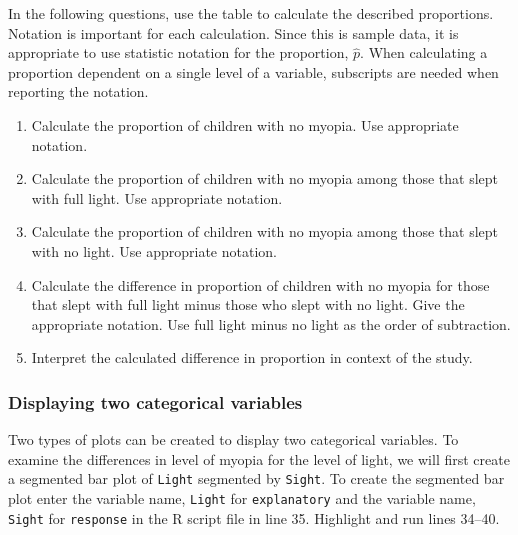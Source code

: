 \documentclass[
]{report}
\begin{document}
In the following questions, use the table to calculate the described proportions. Notation is important for each calculation. Since this is sample data, it is appropriate to use statistic notation for the proportion, \(\hat{p}\). When calculating a proportion dependent on a single level of a variable, subscripts are needed when reporting the notation.

\begin{enumerate}
\def\labelenumi{\arabic{enumi}.}
\setcounter{enumi}{3}
\item
  Calculate the proportion of children with no myopia. Use appropriate notation.
  \vspace{0.3in}
\item
  Calculate the proportion of children with no myopia among those that slept with full light. Use appropriate notation.
  \vspace{0.3in}
\item
  Calculate the proportion of children with no myopia among those that slept with no light. Use appropriate notation.
  \vspace{0.3in}
\item
  Calculate the difference in proportion of children with no myopia for those that slept with full light minus those who slept with no light. Give the appropriate notation. Use full light minus no light as the order of subtraction.
  \vspace{0.8in}
\item
  Interpret the calculated difference in proportion in context of the study.
\end{enumerate}

\vspace{1in}

\subsubsection*{Displaying two categorical variables}\label{displaying-two-categorical-variables}

Two types of plots can be created to display two categorical variables. To examine the differences in level of myopia for the level of light, we will first create a segmented bar plot of \texttt{Light} segmented by \texttt{Sight}. To create the segmented bar plot enter the variable name, \texttt{Light} for \texttt{explanatory} and the variable name, \texttt{Sight} for \texttt{response} in the R script file in line 35. Highlight and run lines 34--40.
\end{document}
